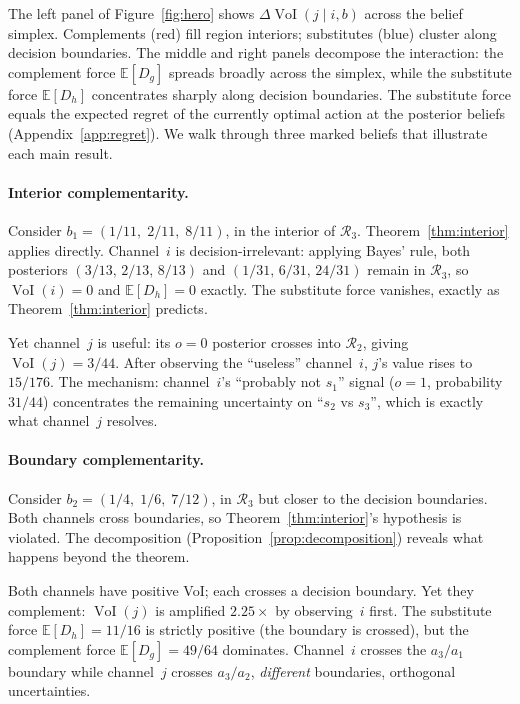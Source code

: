\documentclass{article}
\newcommand{\VoI}{\operatorname{VoI}}
\newcommand{\E}{\mathbb{E}}
\newcommand{\Dg}{D_g}
\newcommand{\Dh}{D_h}
\begin{document}
The left panel of Figure~\ref{fig:hero} shows $\Delta\VoI(j \mid i, b)$ across the belief simplex. Complements (red) fill region interiors; substitutes (blue) cluster along decision boundaries. The middle and right panels decompose the interaction: the complement force $\E[\Dg]$ spreads broadly across the simplex, while the substitute force $\E[\Dh]$ concentrates sharply along decision boundaries. The substitute force equals the expected regret of the currently optimal action at the posterior beliefs (Appendix~\ref{app:regret}). We walk through three marked beliefs that illustrate each main result.

\paragraph{Interior complementarity.}
Consider $b_1 = (1/11,\; 2/11,\; 8/11)$, in the interior of $\mathcal{R}_3$. Theorem~\ref{thm:interior} applies directly. Channel~$i$ is decision-irrelevant: applying Bayes' rule, both posteriors $(3/13,\, 2/13,\, 8/13)$ and $(1/31,\, 6/31,\, 24/31)$ remain in $\mathcal{R}_3$, so $\VoI(i) = 0$ and $\E[\Dh] = 0$ exactly. The substitute force vanishes, exactly as Theorem~\ref{thm:interior} predicts.

Yet channel~$j$ is useful: its $o{=}0$ posterior crosses into $\mathcal{R}_2$, giving $\VoI(j) = 3/44$. After observing the ``useless'' channel~$i$, $j$'s value rises to $15/176$. The mechanism: channel~$i$'s ``probably not $s_1$'' signal ($o{=}1$, probability $31/44$) concentrates the remaining uncertainty on ``$s_2$ vs $s_3$'', which is exactly what channel~$j$ resolves.

\paragraph{Boundary complementarity.}
Consider $b_2 = (1/4,\; 1/6,\; 7/12)$, in $\mathcal{R}_3$ but closer to the decision boundaries. Both channels cross boundaries, so Theorem~\ref{thm:interior}'s hypothesis is violated. The decomposition (Proposition~\ref{prop:decomposition}) reveals what happens beyond the theorem.

Both channels have positive VoI; each crosses a decision boundary. Yet they complement: $\VoI(j)$ is amplified $2.25\times$ by observing~$i$ first. The substitute force $\E[\Dh] = 11/16$ is strictly positive (the boundary is crossed), but the complement force $\E[\Dg] = 49/64$ dominates. Channel~$i$ crosses the $a_3/a_1$ boundary while channel~$j$ crosses $a_3/a_2$, \emph{different} boundaries, orthogonal uncertainties.
\end{document}
